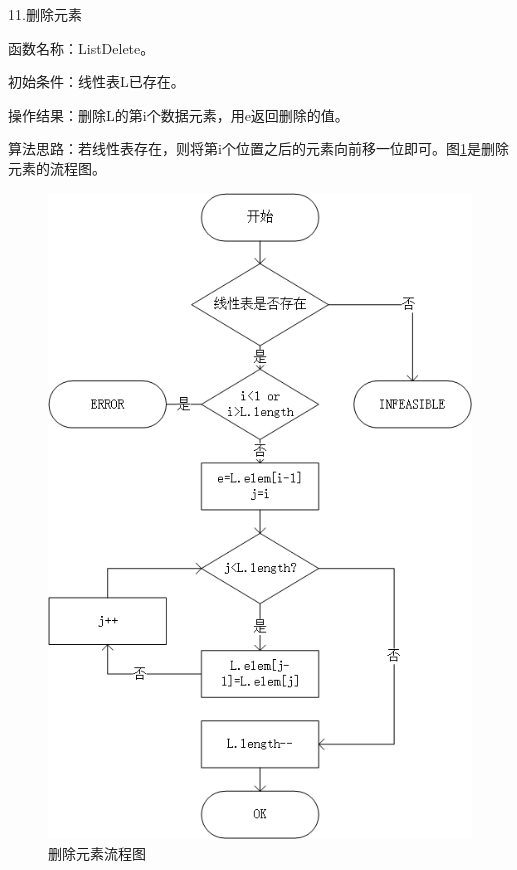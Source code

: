 \documentclass[supercite]{Experimental_Report}
\theoremstyle{definition}
\begin{document}
\newpage

11.删除元素

函数名称：ListDelete。

初始条件：线性表L已存在。

操作结果：删除L的第i个数据元素，用e返回删除的值。

算法思路：若线性表存在，则将第i个位置之后的元素向前移一位即可。图\ref{fig1-11}是删除元素的流程图。
\begin{figure}[htb] %
	\begin{center}
		\includegraphics[scale=0.9]{./images/顺序表/delete.jpg}
		\caption{删除元素流程图}
		\label{fig1-11}
	\end{center}
\end{figure}
\end{document}
